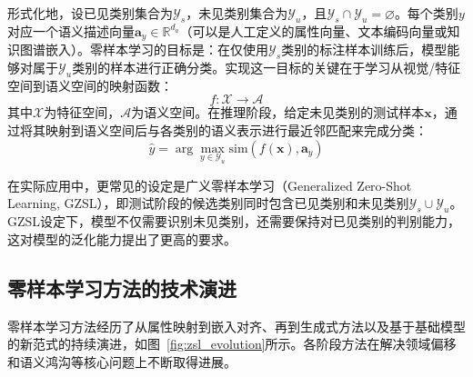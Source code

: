 形式化地，设已见类别集合为$\mathcal{Y}_s$，未见类别集合为$\mathcal{Y}_u$，且$\mathcal{Y}_s \cap \mathcal{Y}_u = \varnothing$。每个类别$y$对应一个语义描述向量$\mathbf{a}_y \in \mathbb{R}^{d_a}$（可以是人工定义的属性向量、文本编码向量或知识图谱嵌入）。零样本学习的目标是：在仅使用$\mathcal{Y}_s$类别的标注样本训练后，模型能够对属于$\mathcal{Y}_u$类别的样本进行正确分类。实现这一目标的关键在于学习从视觉/特征空间到语义空间的映射函数：
\begin{equation}
f: \mathcal{X} \to \mathcal{A}
\end{equation}
其中$\mathcal{X}$为特征空间，$\mathcal{A}$为语义空间。在推理阶段，给定未见类别的测试样本$\mathbf{x}$，通过将其映射到语义空间后与各类别的语义表示进行最近邻匹配来完成分类：
\begin{equation}
\hat{y} = \arg\max_{y \in \mathcal{Y}_u} \text{sim}(f(\mathbf{x}), \mathbf{a}_y)
\end{equation}

在实际应用中，更常见的设定是广义零样本学习（Generalized Zero-Shot Learning, GZSL），即测试阶段的候选类别同时包含已见类别和未见类别$\mathcal{Y}_s \cup \mathcal{Y}_u$。GZSL设定下，模型不仅需要识别未见类别，还需要保持对已见类别的判别能力，这对模型的泛化能力提出了更高的要求。

\subsection{零样本学习方法的技术演进}

零样本学习方法经历了从属性映射到嵌入对齐、再到生成式方法以及基于基础模型的新范式的持续演进，如图~\ref{fig:zsl_evolution}所示。各阶段方法在解决领域偏移和语义鸿沟等核心问题上不断取得进展。

